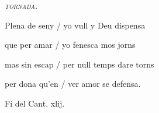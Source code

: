 \documentclass[12pt]{article}
\begin{document}
\begin{estrofaExtra}%




\begin{tornada}

\textit{\textsc{tornada.}}

\end{tornada}


\end{estrofaExtra}


\begin{estrofa}

 Plena de seny / yo vull y Deu dispensa

 que per amar / yo fenesca mos jorns

 mas sin escap / per null temps dare torns

 per dona qu'en / ver amor se defensa.

\end{estrofa}



\begin{estrofaExtra}%

\begin{final}

Fi del Cant. xlij.

\end{final}

\end{estrofaExtra}
\end{document}

